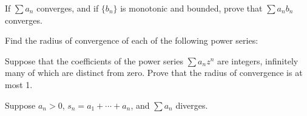 \begin{questions}
  \question If $\sum a_n$ converges, and if $\{b_n\}$ is monotonic and bounded, prove that $\sum a_nb_n$ converges.

  \question Find the radius of convergence of each of the following power series:

  \question Suppose that the coefficients of the power series $\sum a_nz^n$ are integers, infinitely many of which are distinct from zero. Prove that the radius of convergence is at most 1.

  \question Suppose $a_n>0$, $s_n=a_1+\cdots+a_n$, and $\sum a_n$ diverges.
\end{questions}
